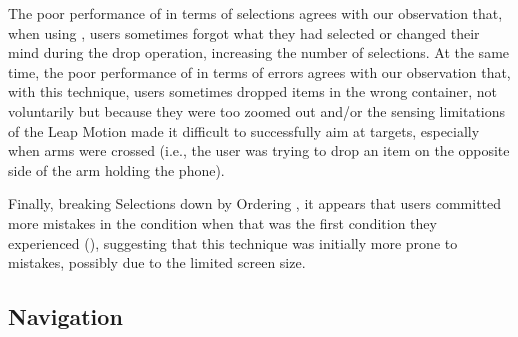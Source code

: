 The poor performance of  in terms of selections agrees with our observation that, when using , users sometimes forgot what they had selected or changed their mind during the drop operation, increasing the number of selections. At the same time, the poor performance of  in terms of errors agrees with our observation that, with this technique, users sometimes dropped items in the wrong container, not voluntarily but because they were too zoomed out and/or the sensing limitations of the Leap Motion made it difficult to successfully aim at targets, especially when arms were crossed (i.e., the user was trying to drop an item on the opposite side of the arm holding the phone).

Finally, breaking Selections down by Ordering , it appears that users committed more mistakes in the  condition when that was the first condition they experienced (), suggesting that this technique was initially more prone to mistakes, possibly due to the limited screen size.


\subsection{Navigation}
\label{subsec:experiment_results_navigation}

